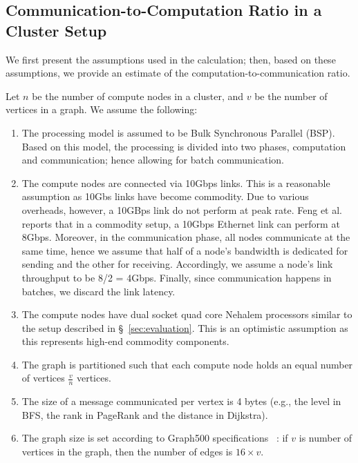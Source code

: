 \subsection{Communication-to-Computation Ratio in a Cluster Setup}
\label{sec:model}
We first present the assumptions used in the calculation; then, based on these assumptions, we provide an estimate of the computation-to-communication ratio. 

Let $n$ be the number of compute nodes in a cluster, and $v$ be the number of vertices in a graph. We assume the following:
\begin{enumerate}
\item The processing model is assumed to be Bulk Synchronous Parallel (BSP). Based on this model, the processing is divided into two phases, computation and communication; hence allowing for batch communication.

\item The compute nodes are connected via 10Gbps links. This is a reasonable assumption as 10Gbs links have become commodity. Due to various overheads, however, a 10GBps link do not perform at peak rate. Feng et al. \cite{Feng2003} reports that in a commodity setup, a 10Gbps Ethernet link can perform at 8Gbps. Moreover, in the communication phase, all nodes communicate at the same time, hence we assume that half of a node's bandwidth is dedicated for sending and the other for receiving. Accordingly, we assume a node's link throughput to be 8/2 = 4Gbps. Finally, since communication happens in batches, we discard the link latency.

\item The compute nodes have dual socket quad core Nehalem processors similar to the setup described in \S~\ref{sec:evaluation}. This is an optimistic assumption as this represents high-end commodity components.

\item The graph is partitioned such that each compute node holds an equal number of vertices $\frac{v}{n}$ vertices.

\item The size of a message communicated per vertex is 4 bytes (e.g., the level in BFS, the rank in PageRank and the distance in Dijkstra).

\item The graph size is set according to Graph500 specifications ~\cite{graph500}: if $v$ is number of vertices in the graph, then the number of edges is $16 \times v$.


\end{enumerate}
